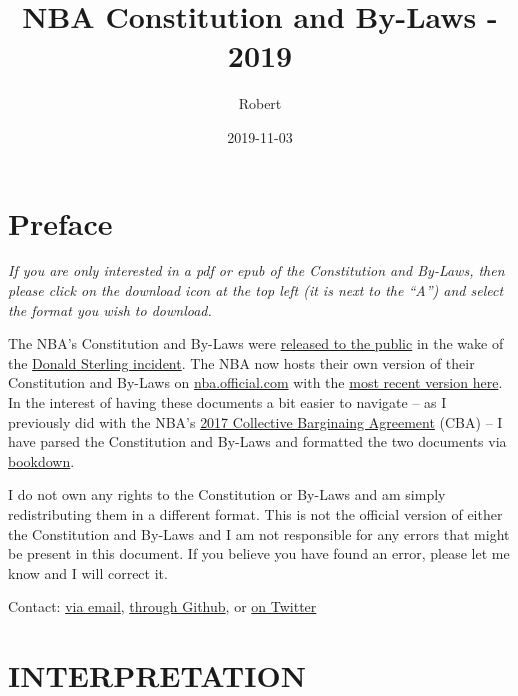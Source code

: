 \documentclass[]{book}
\title{NBA Constitution and By-Laws - 2019}
\author{Robert}
\date{2019-11-03}
\begin{document}
\maketitle

{
\setcounter{tocdepth}{1}
\tableofcontents
}
\hypertarget{preface}{%
\chapter*{Preface}\label{preface}}

\emph{If you are only interested in a pdf or epub of the Constitution and By-Laws, then please click on the download icon at the top left (it is next to the ``A'') and select the format you wish to download.}

The NBA's Constitution and By-Laws were \href{http://prawfsblawg.blogs.com/files/221035054-nba-constitution-and-by-laws.pdf}{released to the public} in the wake of the \href{https://deadspin.com/that-secret-nba-constitution-is-now-online-1569509012}{Donald Sterling incident}. The NBA now hosts their own version of their Constitution and By-Laws on \href{https://official.nba.com/}{nba.official.com} with the \href{https://ak-static.cms.nba.com/wp-content/uploads/sites/4/2019/09/NBA-Constitution-By-Laws-September-2019-1.pdf}{most recent version here}. In the interest of having these documents a bit easier to navigate -- as I previously did with the NBA's \href{https://atlhawksfanatic.github.io/NBA-CBA/}{2017 Collective Barginaing Agreement} (CBA) -- I have parsed the Constitution and By-Laws and formatted the two documents via \href{https://bookdown.org/yihui/bookdown/}{bookdown}.

I do not own any rights to the Constitution or By-Laws and am simply redistributing them in a different format. This is not the official version of either the Constitution and By-Laws and I am not responsible for any errors that might be present in this document. If you believe you have found an error, please let me know and I will correct it.

Contact: \href{atlhawksfanatic@gmail.com}{via email}, \href{https://github.com/atlhawksfanatic}{through Github}, or \href{https://twitter.com/atlhawksfanatic}{on Twitter}

\hypertarget{interpretation}{%
\chapter{INTERPRETATION}\label{interpretation}}
\end{document}

